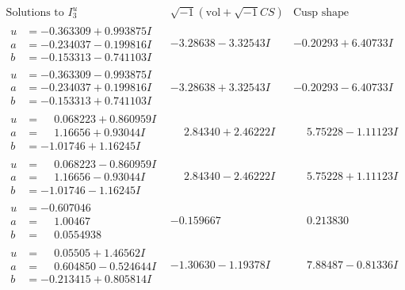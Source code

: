 \documentclass[1p]{elsarticle_modified}
\theoremstyle{definition}
\newcommand{\I}{\sqrt{-1}}
\begin{document}
$$\begin{array}{c|c|c}  
\text{Solutions to }I^u_{3}& \I (\text{vol} + \sqrt{-1}CS) & \text{Cusp shape}\\
 \hline 
\begin{aligned}
u &= -0.363309 + 0.993875 I \\
a &= -0.234037 - 0.199816 I \\
b &= -0.153313 - 0.741103 I\end{aligned}
 & -3.28638 - 3.32543 I & -0.20293 + 6.40733 I \\ \hline\begin{aligned}
u &= -0.363309 - 0.993875 I \\
a &= -0.234037 + 0.199816 I \\
b &= -0.153313 + 0.741103 I\end{aligned}
 & -3.28638 + 3.32543 I & -0.20293 - 6.40733 I \\ \hline\begin{aligned}
u &= \phantom{-}0.068223 + 0.860959 I \\
a &= \phantom{-}1.16656 + 0.93044 I \\
b &= -1.01746 + 1.16245 I\end{aligned}
 & \phantom{-}2.84340 + 2.46222 I & \phantom{-}5.75228 - 1.11123 I \\ \hline\begin{aligned}
u &= \phantom{-}0.068223 - 0.860959 I \\
a &= \phantom{-}1.16656 - 0.93044 I \\
b &= -1.01746 - 1.16245 I\end{aligned}
 & \phantom{-}2.84340 - 2.46222 I & \phantom{-}5.75228 + 1.11123 I \\ \hline\begin{aligned}
u &= -0.607046\phantom{ +0.000000I} \\
a &= \phantom{-}1.00467\phantom{ +0.000000I} \\
b &= \phantom{-}0.0554938\phantom{ +0.000000I}\end{aligned}
 & -0.159667\phantom{ +0.000000I} & \phantom{-}0.213830\phantom{ +0.000000I} \\ \hline\begin{aligned}
u &= \phantom{-}0.05505 + 1.46562 I \\
a &= \phantom{-}0.604850 - 0.524644 I \\
b &= -0.213415 + 0.805814 I\end{aligned}
 & -1.30630 - 1.19378 I & \phantom{-}7.88487 - 0.81336 I \\ \hline\begin{aligned}

\end{aligned}
\end{array}$$
\end{document}

